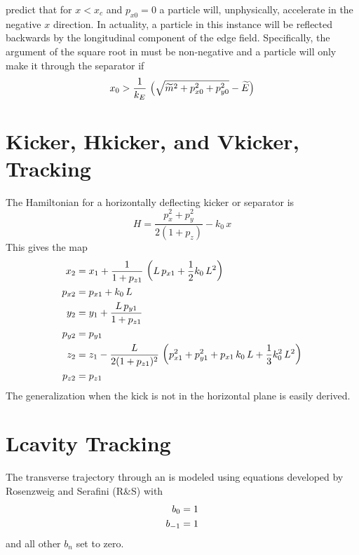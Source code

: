  predict that for $x < x_c$ and $p_{x0} = 0$ a particle
will, unphysically, accelerate in the negative $x$ direction. In
actuality, a particle in this instance will be reflected backwards by
the longitudinal component of the edge field. Specifically, the
argument of the square root in  must be non-negative and
a particle will only make it through the separator if
\begin{equation}
  x_0 > \frac{1}{k_E} \, \left( \sqrt{\widetilde m^2 + p_{x0}^2 + p_{y0}^2} - \widetilde E \right)
\end{equation}

\section{Kicker, Hkicker, and Vkicker, Tracking}
\label{s:kicker.std}

The Hamiltonian for a horizontally deflecting kicker or separator is
\begin{equation}
  H = \frac{p_x^2 + p_y^2}{2 (1 + p_z)} - k_0 \, x 
\end{equation}
This gives the map
\begin{align}
  x_2    &= x_1 + \frac{1}{1 + p_{z1}} \, \left( L \, p_{x1} + \frac{1}{2} k_0 \, L^2 \right) \nonumber \\
  p_{x2} &= p_{x1} + k_0 \, L \nonumber \\
  y_2    &= y_1 + \frac{L \, p_{y1}}{1 + p_{z1}} \nonumber \\
  p_{y2} &= p_{y1}  \\
  z_2    &= z_1 - \frac{L}{2 (1 + p_{z1})^2} \, 
    \left( p_{x1}^2 + p_{y1}^2 + p_{x1} \, k_0 \, L + \frac{1}{3} k_0^2 \, L^2 \right) \nonumber \\
  p_{z2} &= p_{z1} \nonumber
\end{align}
The generalization when the kick is not in the horizontal plane is easily derived.

\section{Lcavity Tracking}
\label{s:lcavity.std}

The transverse trajectory through an  is modeled using equations
developed by Rosenzweig and Serafini\cite{b:rosenzweig} (R\&S) with
\begin{align}
  b_0 &= 1 \nonumber \\
  b_{-1} &= 1 
\end{align}
and all other $b_n$ set to zero.

